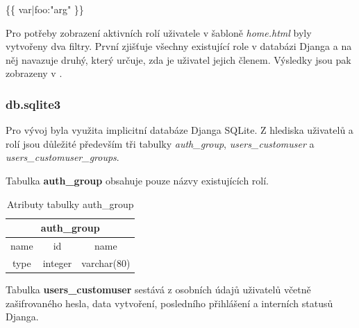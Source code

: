 \textsf{\{\{ var|foo:"arg" \}\}}

Pro potřeby zobrazení aktivních rolí uživatele v šabloně \textit{home.html} byly vytvořeny dva filtry. První zjišťuje všechny existující role v databázi Djanga a na něj navazuje druhý, který určuje, zda je uživatel jejich členem. Výsledky jsou pak zobrazeny v .

\subsubsection{db.sqlite3}

Pro vývoj byla využita implicitní databáze Djanga SQLite. Z hlediska uživatelů a rolí jsou důležité především tři tabulky \textit{auth\_group}, \textit{users\_customuser} a \textit{users\_customuser\_groups}. 

Tabulka \textbf{auth\_group} obsahuje pouze názvy existujících rolí.

\begin{table}[H]
\centering
\begin{tabular}{@{}|c|c|c|@{}}
\toprule
\multicolumn{3}{|c|}{auth\_group} \\ \midrule
name & id & name \\ \midrule
type & integer & varchar(80) \\ \bottomrule
\end{tabular}
\caption{Atributy tabulky auth\_group}
\label{tab:auth-group}
\end{table}

Tabulka \textbf{users\_customuser} sestává z osobních údajů uživatelů včetně zašifrovaného hesla, data vytvoření, posledního přihlášení a interních statusů Djanga. 

\begin{table}[H]
\centering
{}
\caption{Atributy tabulky users\_customuser 1/2}
\label{tab:users-customuser-1}
\end{table}

\begin{table}[H]
\centering
{}
\caption{Atributy tabulky users\_customuser 2/2}
\label{tab:users-customuser-2}
\end{table}

